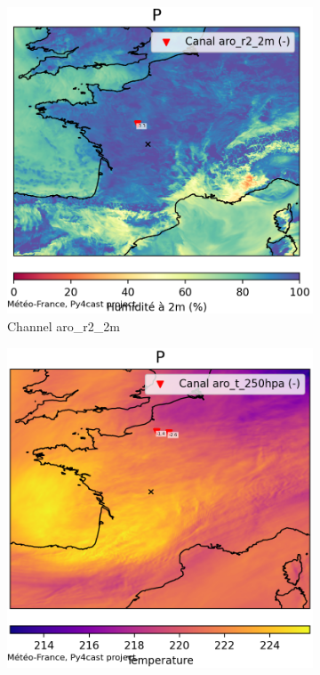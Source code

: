 \begin{figure}[h]
    \centering
    \begin{subfigure}[b]{0.44\textwidth}
        \includegraphics[width=\textwidth]{Images/titan_rain_anchors/nov-21/complete/2023112100_feature_aro_r2_2m.png}
        \caption{Channel aro\_r2\_2m}
    \end{subfigure}
    \hfill
    \begin{subfigure}[b]{0.44\textwidth}
        \includegraphics[width=\textwidth]{Images/titan_rain_anchors/nov-21/complete/2023112100_feature_aro_t_250hpa.png}

\end{subfigure}
\end{figure}
